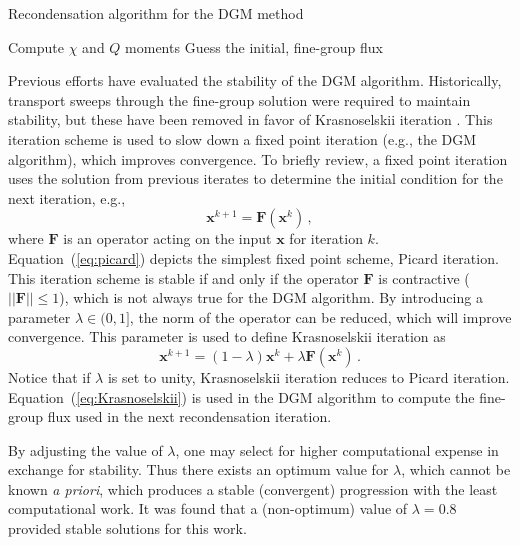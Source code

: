 \documentclass[5p,times,twocolumn,10pt]{elsarticle}
\renewcommand{\vec}[1]{\bm{#1}} %
\newcommand{\EQUATION}[1]{Equation~(\ref{#1})}    %
\newcommand{\mat}[1]{\ensuremath{\bm{#1}}}
\renewcommand{\vec}[1]{\ensuremath{\bm{#1}}}
\begin{document}
    \DontPrintSemicolon
    \begin{algorithm}[htb]
        \caption{Recondensation algorithm for the DGM method}
        Compute $\chi$ and $Q$ moments\;
        Guess the initial, fine-group flux\;
        \label{alg:DGM}
    \end{algorithm}

    Previous efforts have evaluated the stability of the DGM algorithm.
    Historically, transport sweeps through the fine-group solution were required to maintain stability, but these have been removed in favor of Krasnoselskii iteration \cite{gibson_stability_2014}.
    This iteration scheme is used to slow down a fixed point iteration (e.g., the DGM algorithm), which improves convergence.
    To briefly review, a fixed point iteration uses the solution from previous iterates to determine the initial condition for the next iteration, e.g.,
    \begin{equation}
        \vec{x}^{k+1}=\vec{F}(\vec{x}^k)\, ,
        \label{eq:picard}
    \end{equation}
    where $\vec{F}$ is an operator acting on the input $\vec{x}$ for iteration $k$.
    \EQUATION{eq:picard} depicts the simplest fixed point scheme, Picard iteration.
    This iteration scheme is stable if and only if the operator $\vec{F}$ is contractive ($||\mat{F}||\leq1$), which is not always true for the DGM algorithm.
    By introducing a parameter $\lambda\in(0,1]$, the norm of the operator can be reduced, which will improve convergence.
    This parameter is used to define Krasnoselskii iteration as
    \begin{equation}
        \vec{x}^{k+1}=(1-\lambda)\vec{x}^k + \lambda\vec{F}(\vec{x}^k)\, .
        \label{eq:Krasnoselskii}
    \end{equation}
    Notice that if $\lambda$ is set to unity, Krasnoselskii iteration reduces to Picard iteration.
    \EQUATION{eq:Krasnoselskii} is used in the DGM algorithm to compute the fine-group flux used in the next recondensation iteration.

    By adjusting the value of $\lambda$, one may select for higher computational expense in exchange for stability.
    Thus there exists an optimum value for $\lambda$, which cannot be known {\it a priori}, which produces a stable (convergent) progression with the least computational work.
    It was found that a (non-optimum) value of $\lambda=0.8$ provided stable solutions for this work.
\end{document}
